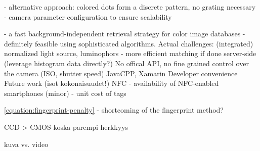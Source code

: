 \documentclass[thesis.tex]{subfiles}
\begin{document}
- alternative approach: colored dots form a discrete pattern, no grating necessary
- camera parameter configuration to ensure scalability

- a fast background-independent retrieval strategy for color image databases
- definitely feasible using sophisticated algorithms. Actual challenges: (integrated) normalized light source, luminophors
- more efficient matching if done server-side (leverage histogram data directly?)
No offical API, no fine grained control over the camera (ISO, shutter speed)
JavaCPP, Xamarin
Developer convenience
Future work (isot kokonaisuudet!)
NFC
- availability of NFC-enabled smartphones (minor)
- unit cost of tags

\ref{equation:fingerprint-penalty} - shortcoming of the fingerprint method?

CCD > CMOS koska parempi herkkyys

kuva vs. video

\begin{comment}
Color calibration

There are mainly two modules responsible for the color-rendering accuracy of a digital camera: the former is the illuminant estimation and correction module, and the latter is the color matrix transformation aimed to adapt the color response of the sensor to a standard color space. These two modules together form what may be called the color correction pipeline.

RGB is a device-dependent color model: different devices detect or reproduce a given RGB value differently, since the color elements (such as phosphors or dyes) and their response to the individual R, G, and B levels vary from manufacturer to manufacturer, or even in the same device over time. Thus an RGB value does not define the same color across devices without some kind of color management.

\url{http://www.cis.rit.edu/~jxj1770/publications/paperEI_Xerox.pdf}

\url{http://www.cs.unc.edu/techreports/04-012.pdf}
\end{comment}
\end{document}
